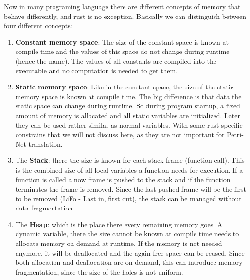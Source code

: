 Now in many programing language there are different concepts of memory that behave differently, and rust is no exception.
Basically we can distinguish between four different concepts:
\begin{enumerate}
    \item \textbf{Constant memory space}: The size of the constant space is known at compile time and the values of this space do not change during runtime (hence the name).
    The values of all constants are compiled into the executable and no computation is needed to get them.
    \item \textbf{Static memory space}: Like in the constant space, the size of the static memory space is known at compile time.
    The big difference is that data the static space can change during runtime.
    So during program startup, a fixed amount of memory is allocated and all static variables are initialized.
    Later they can be used rather similar as normal variables. With some rust specific constrains that we will not discuss here, as they are not important for Petri-Net translation.
    \item The \textbf{Stack}: there the size is known for each stack frame (function call).
    This is the combined size of all local variables a function needs for execution.
    If a function is called a now frame is pushed to the stack and if the function terminates the frame is removed.
    Since the last pushed frame will be the first to be removed (LiFo - Last in, first out), the stack can be managed without data fragmentation.
    \item The \textbf{Heap}: which is the place there every remaining memory goes.
    A dynamic variable, there the size cannot be known at compile time needs to allocate memory on demand at runtime.
    If the memory is not needed anymore, it will be deallocated and the again free space can be reused.
    Since both allocation and deallocation are on demand, this can introduce memory fragmentation, since the size of the holes is not uniform.
\end{enumerate}


